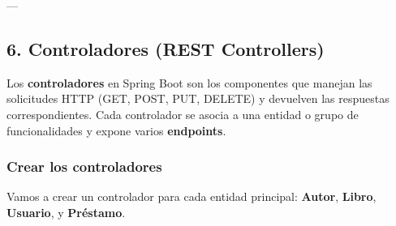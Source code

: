 \documentclass[11pt]{article}
\begin{document}
---



\subsection{6. Controladores (REST Controllers)}
\label{sec:orgf0b1fdc}
Los \textbf{\textbf{controladores}} en Spring Boot son los componentes que manejan
las solicitudes HTTP (GET, POST, PUT, DELETE) y devuelven las
respuestas correspondientes. Cada controlador se asocia a una entidad
o grupo de funcionalidades y expone varios \textbf{\textbf{endpoints}}.

\subsubsection{Crear los controladores}
\label{sec:orgf076557}
Vamos a crear un controlador para cada entidad principal: \textbf{\textbf{Autor}}, \textbf{\textbf{Libro}}, \textbf{\textbf{Usuario}}, y \textbf{\textbf{Préstamo}}.
\end{document}
